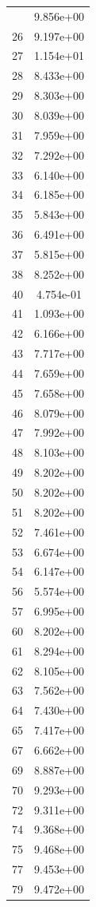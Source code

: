 \documentclass[12pt]{article}
\begin{document}
\begin{longtable}{@{}cc@{}}
\bottomrule
\endlastfoot
25 & 9.856e+00 \\
26 & 9.197e+00 \\
27 & 1.154e+01 \\
28 & 8.433e+00 \\
29 & 8.303e+00 \\
30 & 8.039e+00 \\
31 & 7.959e+00 \\
32 & 7.292e+00 \\
33 & 6.140e+00 \\
34 & 6.185e+00 \\
35 & 5.843e+00 \\
36 & 6.491e+00 \\
37 & 5.815e+00 \\
38 & 8.252e+00 \\
40 & 4.754e-01 \\
41 & 1.093e+00 \\
42 & 6.166e+00 \\
43 & 7.717e+00 \\
44 & 7.659e+00 \\
45 & 7.658e+00 \\
46 & 8.079e+00 \\
47 & 7.992e+00 \\
48 & 8.103e+00 \\
49 & 8.202e+00 \\
50 & 8.202e+00 \\
51 & 8.202e+00 \\
52 & 7.461e+00 \\
53 & 6.674e+00 \\
54 & 6.147e+00 \\
56 & 5.574e+00 \\
57 & 6.995e+00 \\
60 & 8.202e+00 \\
61 & 8.294e+00 \\
62 & 8.105e+00 \\
63 & 7.562e+00 \\
64 & 7.430e+00 \\
65 & 7.417e+00 \\
67 & 6.662e+00 \\
69 & 8.887e+00 \\
70 & 9.293e+00 \\
72 & 9.311e+00 \\
74 & 9.368e+00 \\
75 & 9.468e+00 \\
77 & 9.453e+00 \\
79 & 9.472e+00 \\

\end{longtable}
\end{document}
